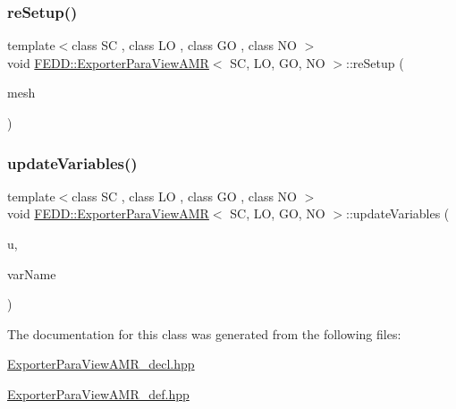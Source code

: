 \subsubsection{\texorpdfstring{re\+Setup()}{reSetup()}}
{\footnotesize\ttfamily template$<$class SC , class LO , class GO , class NO $>$ \\
void \hyperlink{classFEDD_1_1ExporterParaViewAMR}{F\+E\+D\+D\+::\+Exporter\+Para\+View\+A\+MR}$<$ SC, LO, GO, NO $>$\+::re\+Setup (\begin{DoxyParamCaption}\item[{\hyperlink{classFEDD_1_1ExporterParaViewAMR_abdb6338dbd32c5ac33078c866e03bdae}{Mesh\+Ptr\+\_\+\+Type}}]{mesh }\end{DoxyParamCaption})}

\mbox{\label{classFEDD_1_1ExporterParaViewAMR_a491f740253489d8496666fc8bb2cb248}} 
\subsubsection{\texorpdfstring{update\+Variables()}{updateVariables()}}
{\footnotesize\ttfamily template$<$class SC , class LO , class GO , class NO $>$ \\
void \hyperlink{classFEDD_1_1ExporterParaViewAMR}{F\+E\+D\+D\+::\+Exporter\+Para\+View\+A\+MR}$<$ SC, LO, GO, NO $>$\+::update\+Variables (\begin{DoxyParamCaption}\item[{\hyperlink{classFEDD_1_1ExporterParaViewAMR_a6be568ff4943f421566c689db311cdd3}{Multi\+Vector\+Const\+Ptr\+\_\+\+Type} \&}]{u,  }\item[{std\+::string}]{var\+Name }\end{DoxyParamCaption})}



The documentation for this class was generated from the following files\+:\begin{DoxyCompactItemize}
\item 
\hyperlink{ExporterParaViewAMR__decl_8hpp}{Exporter\+Para\+View\+A\+M\+R\+\_\+decl.\+hpp}\item 
\hyperlink{ExporterParaViewAMR__def_8hpp}{Exporter\+Para\+View\+A\+M\+R\+\_\+def.\+hpp}\end{DoxyCompactItemize}
